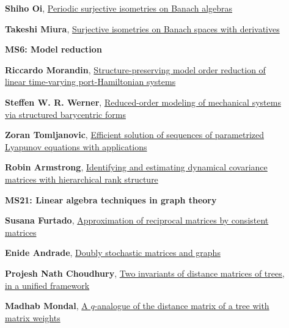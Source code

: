 \documentclass[ILAS2025-program.tex]{subfiles}
\begin{document}
\begin{description}
\begin{description}
        \item[] \hypertarget{up0163}{}\textbf{Shiho Oi}, \hyperlink{down0163}{Periodic surjective isometries on Banach algebras}
        \item[] \hypertarget{up0164}{}\textbf{Takeshi Miura}, \hyperlink{down0164}{Surjective isometries on Banach spaces with derivatives}
        \end{description}
    \begin{description}
    \item[] {\color{mstitle}\textbf{MS6: Model reduction}} 
    \item[] \hypertarget{up0165}{}\textbf{Riccardo Morandin}, \hyperlink{down0165}{Structure-preserving model order reduction of linear time-varying port-Hamiltonian systems}
        \item[] \hypertarget{up0166}{}\textbf{Steffen W. R. Werner}, \hyperlink{down0166}{Reduced-order modeling of mechanical systems via structured barycentric forms}
        \item[] \hypertarget{up0167}{}\textbf{Zoran Tomljanovic}, \hyperlink{down0167}{Efficient solution of sequences of parametrized Lyapunov equations with applications}
        \item[] \hypertarget{up0168}{}\textbf{Robin Armstrong}, \hyperlink{down0168}{Identifying and estimating dynamical covariance matrices with hierarchical rank structure}
        \end{description}
    \begin{description}
    \item[] {\color{mstitle}\textbf{MS21: Linear algebra techniques in graph theory}} 
    \item[] \hypertarget{up0169}{}\textbf{Susana Furtado}, \hyperlink{down0169}{Approximation of reciprocal matrices by consistent matrices}
        \item[] \hypertarget{up0170}{}\textbf{Enide Andrade}, \hyperlink{down0170}{Doubly stochastic matrices and graphs}
        \item[] \hypertarget{up0171}{}\textbf{Projesh Nath Choudhury}, \hyperlink{down0171}{Two invariants of distance matrices of trees, in a unified framework}
        \item[] \hypertarget{up0172}{}\textbf{Madhab Mondal}, \hyperlink{down0172}{A $q$-analogue of the distance matrix of a tree with matrix weights}

\end{description}
\end{description}
\end{document}
